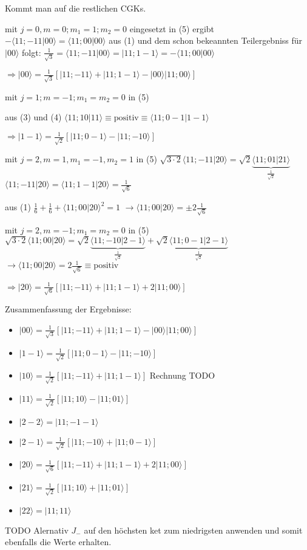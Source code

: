 Kommt man auf die restlichen CGKs. 

mit \(j=0,m=0; m_1=1; m_2=0\) eingesetzt in (5) ergibt \(- \langle 11;-11|00\rangle = \langle 11;00|00\rangle \) 
aus (1) und dem schon bekeannten Teilergebniss für \(|00\rangle\) folgt: \( \frac{1}{\sqrt 3} = \langle 11;-11|00\rangle = |11;1-1\rangle= -\langle 11;00|00\rangle\)

\(\Rightarrow |00\rangle =  \frac{1}{\sqrt 3}[|11;-11\rangle + |11;1-1\rangle - |00\rangle|11;00\rangle ]\)

mit \(j=1;m=-1; m_1=m_2=0\) in (5)

aus (3) und (4) \(\langle 11;10|11\rangle\equiv \text{positiv} \equiv \langle 11;0-1|1-1\rangle\)


\(\Rightarrow |1 -1\rangle = \frac{1}{\sqrt 2}[ |11;0-1\rangle - |11;-10\rangle]\)

mit \(j=2,m=1,m_1=-1, m_2=1\) in (5) \(\sqrt{3\cdot 2}\langle 11;-11|20\rangle = \sqrt{2} \underbrace{\langle 11;01|21\rangle}_{\frac 1 {\sqrt{2}}}\)
\(\langle 11;-11|20\rangle = \langle 11;1-1|20\rangle= \frac 1 {\sqrt 6}\)

aus (1) \(\frac{1}{6}+\frac{1}{6}+ \langle 11;00|20\rangle^2 = 1\) \(\rightarrow \langle 11;00|20\rangle=\pm 2 \frac{1}{\sqrt 6}\)

mit \(j=2,m=-1; m_1=m_2=0\) in (5) \(\sqrt{3\cdot 2}\langle 11;00|20\rangle = \sqrt{2} \underbrace{\langle 11;-10|2-1\rangle}_{\frac 1 {\sqrt{2}}}+\sqrt{2}\underbrace{\langle 11;0-1|2-1\rangle}_{\frac 1 {\sqrt{2}}}\)
\(\rightarrow \langle 11;00|20\rangle= 2 \frac{1}{\sqrt 6}\equiv \text{positiv}\)

\(\Rightarrow |2 0\rangle = \frac{1}{\sqrt 6}[|11;-1 1\rangle+|11;1-1\rangle+2|11;00\rangle]\)

Zusammenfassung der Ergebnisse:

\begin{itemize}
\item \(|00\rangle =  \frac{1}{\sqrt 3}[|11;-11\rangle + |11;1-1\rangle - |00\rangle|11;00\rangle ]\)
\item \(|1 -1\rangle = \frac{1}{\sqrt 2}[ |11;0-1\rangle - |11;-10\rangle]\)
\item \(|10\rangle = \frac{1}{\sqrt 2}[|11;-11\rangle + | 11;1-1\rangle]\) Rechnung TODO
\item \(|11\rangle = \frac{1}{\sqrt 2}[ |11;10\rangle - |11;01\rangle]\)
\item \(|2-2\rangle =|11;-1-1\rangle\)
\item \(|2 -1\rangle = \frac{1}{\sqrt 2}[|11;-1 0\rangle + |11;0-1\rangle]\)
\item \(|2 0\rangle = \frac{1}{\sqrt 6}[|11;-1 1\rangle+|11;1-1\rangle+2|11;00\rangle]\)
\item \(|21\rangle =\frac{1}{\sqrt 2}[|11;10\rangle+|11;01\rangle]\)
\item \(|22\rangle = |11;11\rangle\)
\end{itemize}

TODO Alernativ \(J_-\) auf den höchsten ket zum niedrigsten anwenden und somit ebenfalls die Werte erhalten.


